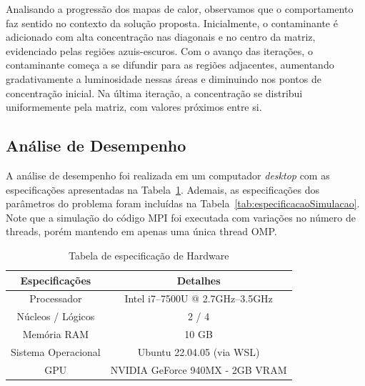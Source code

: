 \documentclass[12pt]{article}
\begin{document}
Analisando a progressão dos mapas de calor, observamos que o comportamento faz
sentido no contexto da solução proposta. Inicialmente, o contaminante é
adicionado com alta concentração nas diagonais e no centro da matriz,
evidenciado pelas regiões azuis-escuros. Com o avanço das iterações, o
contaminante começa a se difundir para as regiões adjacentes, aumentando
gradativamente a luminosidade nessas áreas e diminuindo nos pontos de
concentração inicial. Na última iteração, a concentração se distribui
uniformemente pela matriz, com valores próximos entre si.

\subsection{Análise de Desempenho}

A análise de desempenho foi realizada em um computador \textit{desktop} com as
especificações apresentadas na Tabela~\ref{tab:especificacaoHardware}. Ademais,
as especificações dos parâmetros do problema foram incluídas na
Tabela~\ref{tab:especificacaoSimulacao}. Note que a simulação do código MPI foi
executada com variações no número de threads, porém mantendo em apenas uma
única thread OMP.

\begin{table}[ht]
  \centering
  \caption{Tabela de especificação de Hardware}
  \vspace{0.3cm}
  \begin{tabular}{||c c||}
    \hline
    Especificações      & Detalhes                         \\ [0.5ex]
    \hline\hline
    Processador         & Intel i7--7500U @ 2.7GHz--3.5GHz \\
    \hline
    Núcleos / Lógicos   & 2 / 4                            \\
    \hline
    Memória RAM         & 10 GB                            \\
    \hline
    Sistema Operacional & Ubuntu 22.04.05 (via WSL)        \\
    \hline
    GPU                 & NVIDIA GeForce 940MX - 2GB VRAM  \\
    \hline
  \end{tabular}\label{tab:especificacaoHardware}
\end{table}
\end{document}
